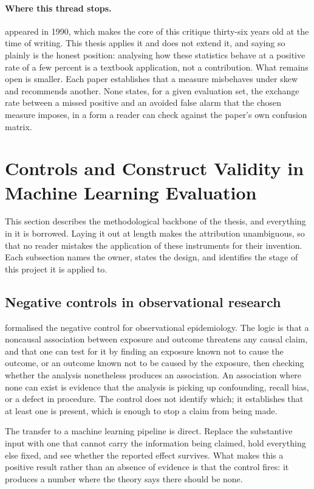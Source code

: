 \paragraph{Where this thread stops.} \citet{feinstein1990paradoxes} appeared in 1990, which
makes the core of this critique thirty-six years old at the time of writing. This thesis
applies it and does not extend it, and saying so plainly is the honest position: analysing
how these statistics behave at a positive rate of a few percent is a textbook application,
not a contribution. What remains open is smaller. Each paper establishes that a measure
misbehaves under skew and recommends another. None states, for a given evaluation set, the
exchange rate between a missed positive and an avoided false alarm that the chosen measure
imposes, in a form a reader can check against the paper's own confusion matrix.

\section{Controls and Construct Validity in Machine Learning Evaluation}
\label{sec:lit-controls}

This section describes the methodological backbone of the thesis, and everything in it is
borrowed. Laying it out at length makes the attribution unambiguous, so that no reader
mistakes the application of these instruments for their invention. Each subsection names the
owner, states the design, and identifies the stage of this project it is applied to.

\subsection{Negative controls in observational research}

\citet{lipsitch2010negative} formalised the negative control for observational epidemiology.
The logic is that a noncausal association between exposure and outcome threatens any causal
claim, and that one can test for it by finding an exposure known not to cause the outcome, or
an outcome known not to be caused by the exposure, then checking whether the analysis
nonetheless produces an association. An association where none can exist is evidence that the
analysis is picking up confounding, recall bias, or a defect in procedure. The control does
not identify which; it establishes that at least one is present, which is enough to stop a
claim from being made.

The transfer to a machine learning pipeline is direct. Replace the substantive input with one
that cannot carry the information being claimed, hold everything else fixed, and see whether
the reported effect survives. What makes this a positive result rather than an absence of
evidence is that the control fires: it produces a number where the theory says there should
be none.


